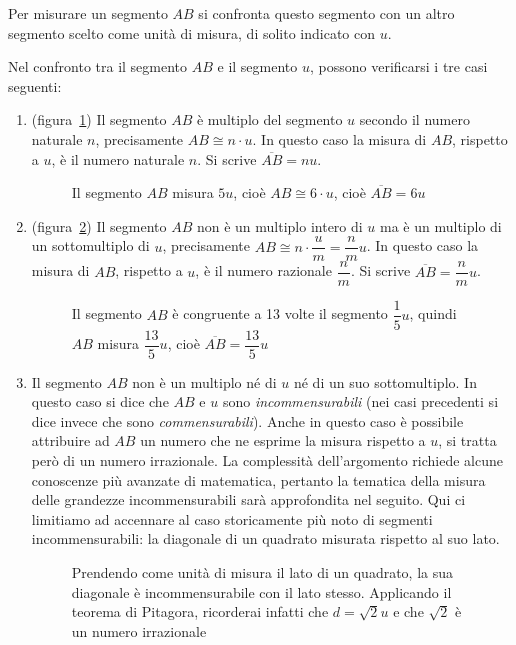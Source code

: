 Per misurare un segmento $AB$ si confronta questo segmento con un altro segmento scelto come unità di misura, di solito indicato con $u$.

Nel confronto tra il segmento $AB$ e il segmento $u$, possono verificarsi i tre casi seguenti:
\begin{enumerate}
\item (figura~\ref{fig:mis_segm1}) Il segmento $AB$ è multiplo del segmento $u$ secondo il numero naturale $n$, precisamente $AB\cong n\cdot u$. In questo caso la misura di $AB$, rispetto a $u$, è il numero naturale $n$. Si scrive $\overline{AB} = nu$.

\begin{figure}[htb]
\centering
\caption{Il segmento $AB$ misura $5u$, cioè $AB\cong 6\cdot u$, cioè $\overline{AB}=6u$}\label{fig:mis_segm1}
\end{figure}

\item (figura~\ref{fig:mis_segm2}) Il segmento $AB$ non è un multiplo intero di $u$ ma è un multiplo di un sottomultiplo di $u$, precisamente $AB\cong n\cdot \dfrac{u}{m}=\dfrac{n}{m}u$. In questo caso la misura di $AB$, rispetto a $u$, è il numero razionale $\dfrac{n}{m}$. Si scrive $\overline{AB} = \dfrac{n}{m}u$.

\begin{figure}[htb]
\centering
\caption{Il segmento $AB$ è congruente a 13 volte il segmento $\dfrac{1}{5}u$, quindi $AB$ misura $\dfrac{13}{5}u$, cioè $\overline{AB}=\dfrac{13}{5}u$}\label{fig:mis_segm2}
\end{figure}

\item Il segmento $AB$ non è un multiplo né di $u$ né di un suo sottomultiplo. In questo caso si dice che $AB$ e $u$ sono \emph{incommensurabili} (nei casi precedenti si dice invece che sono \emph{commensurabili}). Anche in questo caso è possibile attribuire ad $AB$ un numero che ne esprime la misura rispetto a $u$, si tratta però di un numero irrazionale. La complessità dell'argomento richiede alcune conoscenze più avanzate di matematica, pertanto la tematica della misura delle grandezze incommensurabili sarà approfondita nel seguito. Qui ci limitiamo ad accennare al caso storicamente più noto di segmenti incommensurabili: la diagonale di un quadrato misurata rispetto al suo lato.

\begin{figure}[htb]
\centering
\caption{Prendendo come unità di misura il lato di un quadrato, la sua diagonale è incommensurabile con il lato stesso. Applicando il teorema di Pitagora, ricorderai infatti che $d=\sqrt{2}u$ e che $\sqrt{2}$ è un numero irrazionale}
\end{figure}


\end{enumerate}
